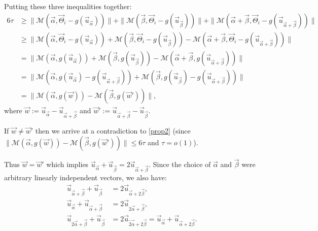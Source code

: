 \documentclass[10pt,a4paper]{article}
\renewcommand{\ge}{ \geqslant}
\renewcommand{\le}{ \leqslant}
\renewcommand{\kappa}{\tau}
\newcommand{\M}{\mathcal{M}}
\begin{document}
Putting these three inequalities together:
\begin{align*}
 6\kappa&\ge \|\M(  \vec{\alpha},\vec{\Theta}_i-g(\vec{u}_{\vec{\alpha}})) \|+\|\M(  \vec{\beta},\vec{\Theta}_i-g(\vec{u}_{\vec{\beta}})) \|+\|\M(  \vec{\alpha}+\vec{\beta},\vec{\Theta}_i-g(\vec{u}_{\vec{\alpha}+\vec{\beta}})) \|\\
  &\ge\|\M(  \vec{\alpha},\vec{\Theta}_i-g(\vec{u}_{\vec{\alpha}})) +\M(  \vec{\beta},\vec{\Theta}_i-g(\vec{u}_{\vec{\beta}})) -\M(  \vec{\alpha}+\vec{\beta},\vec{\Theta}_i-g(\vec{u}_{\vec{\alpha}+\vec{\beta}})) \|\\
  &=\|\M(  \vec{\alpha},g(\vec{u}_{\vec{\alpha}})) +\M(  \vec{\beta},g(\vec{u}_{\vec{\beta}})) -\M(  \vec{\alpha}+\vec{\beta},g(\vec{u}_{\vec{\alpha}+\vec{\beta}})) \|\\
    &=\|\M(  \vec{\alpha},g(\vec{u}_{\vec{\alpha}})-g(\vec{u}_{\vec{\alpha}+\vec{\beta}})) +\M(  \vec{\beta},g(\vec{u}_{\vec{\beta}})-g(\vec{u}_{\vec{\alpha}+\vec{\beta}})) \|\\
      &=\|\M(  \vec{\alpha},g(\vec{w})) -\M(  \vec{\beta},g(\vec{w}')) \|,
\end{align*}
where $\vec{w}:=\vec{u}_{\vec{\alpha}}-\vec{u}_{\vec{\alpha}+\vec{\beta}}$ and $\vec{w}':=\vec{u}_{\vec{\alpha}+\vec{\beta}}-\vec{u}_{\vec{\beta}}$.

 

If $\vec{w}\neq\vec{w}'$ then  we arrive at a  contradiction  to \eqref{prop2} (since $\|\M(  \vec{\alpha},g(\vec{w}))-\M(  \vec{\beta},g(\vec{w}')) \|\le 6\kappa$ and $\kappa=o(1)$). 



Thus $\vec{w}=\vec{w}'$ which implies $\vec{u}_{\vec{\alpha}}+\vec{u}_{\vec{\beta}}=2\vec{u}_{\vec{\alpha}+\vec{\beta}}$. Since the choice of $\vec{\alpha}$ and $\vec{\beta}$ were arbitrary  linearly independent  vectors, we also have:
\begin{align*}
\vec{u}_{\vec{\alpha}+\vec{\beta}}+\vec{u}_{\vec{\beta}}&=2\vec{u}_{\vec{\alpha}+2\vec{\beta}},\\ \vec{u}_{\vec{\alpha}}+\vec{u}_{\vec{\alpha}+\vec{\beta}}&=2\vec{u}_{2\vec{\alpha}+\vec{\beta}},
\\ \vec{u}_{2\vec{\alpha}+\vec{\beta}}+\vec{u}_{\vec{\beta}}&=2\vec{u}_{\vec{2\alpha}+2\vec{\beta}}=\vec{u}_{\vec{\alpha}}+\vec{u}_{\vec{\alpha}+2\vec{\beta}}.
\end{align*}  
\end{document}
